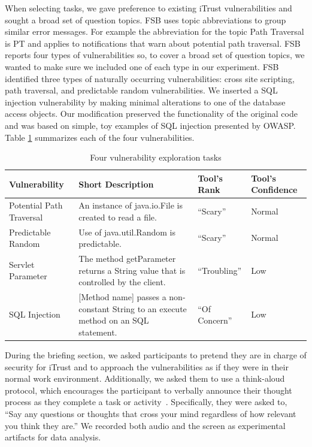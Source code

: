 \documentclass[conference]{IEEEtran}
\begin{document}
When selecting tasks, we gave preference to existing iTrust vulnerabilities and sought a broad set of question topics.  
FSB uses topic abbreviations to group similar error messages. 
For example the abbreviation for the topic Path Traversal is PT and applies to notifications that warn about potential path traversal. 
FSB reports four types of vulnerabilities so, to cover a broad set of question topics, we wanted to make sure we included one of each type in our experiment.
FSB identified three types of naturally occurring vulnerabilities: cross site scripting, path traversal, and predictable random vulnerabilities.
We inserted a SQL injection vulnerability by making minimal alterations to one of the database access objects.
Our modification preserved the functionality of the original code and was based on simple, toy examples of SQL injection presented by OWASP.
Table \ref{table:vulnerabilities} summarizes each of the four vulnerabilities. 

\begin{table} 
\centering
\caption{Four vulnerability exploration tasks}
\begin{tabular}{|l|l|l|l|}
\rowcolor{gray!50}
\hline
    Vulnerability				& Short Description													& Tool's Rank 						& Tool's Confidence\\
    \hline	
    Potential Path Traversal	& An instance of java.io.File is created to read a file.     			& ``Scary''							 	&  Normal\\
    \hline
    Predictable Random			& Use of java.util.Random is predictable. 								& ``Scary''								&  Normal\\
    \hline
    Servlet Parameter 			& The method getParameter returns a String value that is controlled by the client.			& ``Troubling''		&  Low\\
    \hline
    SQL Injection				& [Method name] passes a non-constant String to an execute method on an SQL statement.     	& ``Of Concern''		&  Low\\
    \hline
\end{tabular}
\label{table:vulnerabilities}
\end{table}

During the briefing section, we asked participants to pretend they are in charge of security for iTrust and to approach the vulnerabilities as if they were in their normal work environment.
Additionally, we asked them to use a think-aloud protocol, which encourages the participant to verbally announce their thought process as they complete a task or activity~\cite{nielsen2002getting}. 
Specifically, they were asked to, ``Say any questions or thoughts that cross your mind regardless of how relevant you think they are.''
We recorded both audio and the screen as experimental artifacts for data analysis.
\end{document}
